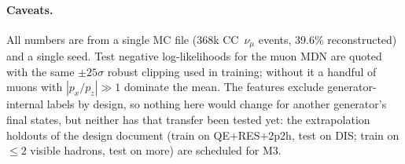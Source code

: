 \paragraph{Caveats.} All numbers are from a single MC file (368k CC~$\nu_\mu$ events, 39.6\% reconstructed)
and a single seed. Test negative log-likelihoods for the muon MDN are quoted with the same $\pm 25\sigma$
robust clipping used in training; without it a handful of muons with $|p_x/p_z| \gg 1$ dominate the mean.
The features exclude generator-internal labels by design, so nothing here would change for another
generator's final states, but neither has that transfer been tested yet: the extrapolation holdouts of
the design document (train on QE+RES+2p2h, test on DIS; train on $\le 2$ visible hadrons, test on more)
are scheduled for M3.
